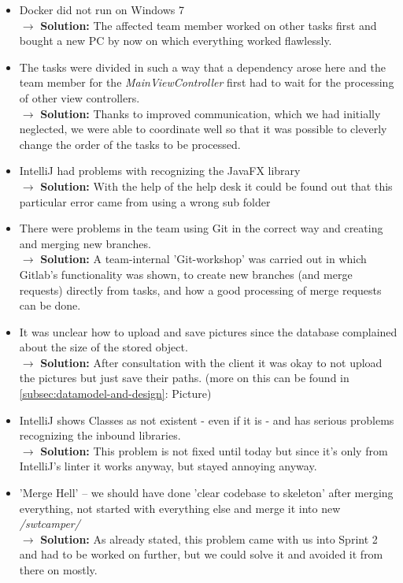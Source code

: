 \begin{itemize}
    \item Docker did not run on Windows 7 \\
    $\rightarrow$ \textbf{Solution:} The affected team member worked on other tasks first and bought a new PC by now on which everything worked flawlessly.
    \item The tasks were divided in such a way that a dependency arose here and the team member for the \textit{MainViewController} first had to wait for the processing of other view controllers.\\
    $\rightarrow$ \textbf{Solution:} Thanks to improved communication, which we had initially neglected, we were able to coordinate well so that it was possible to cleverly change the order of the tasks to be processed.
    \item IntelliJ had problems with recognizing the JavaFX library\\
    $\rightarrow$ \textbf{Solution:} With the help of the help desk it could be found out that this particular error came from using a wrong sub folder
    \item There were problems in the team using Git in the correct way and creating and merging new branches. \\
    $\rightarrow$ \textbf{Solution:} A team-internal 'Git-workshop' was carried out in which Gitlab's functionality was shown, to create new branches (and merge requests) directly from tasks, and how a good processing of merge requests can be done.
    \item It was unclear how to upload and save pictures since the database complained about the size of the stored object. \\
    $\rightarrow$ \textbf{Solution:} After consultation with the client it was okay to not upload the pictures but just save their paths. (more on this can be found in \ref{subsec:datamodel-and-design}: Picture)
    \item IntelliJ shows Classes as not existent - even if it is - and has serious problems recognizing the inbound libraries. \\
    $\rightarrow$ \textbf{Solution:} This problem is not fixed until today but since it's only from IntelliJ's linter it works anyway, but stayed annoying anyway.
    \item 'Merge Hell' – we should have done 'clear codebase to skeleton' after merging everything, not started with everything else and merge it into new \textit{/swtcamper/} \\
    $\rightarrow$ \textbf{Solution:} As already stated, this problem came with us into Sprint 2 and had to be worked on further, but we could solve it and avoided it from there on mostly.
\end{itemize}